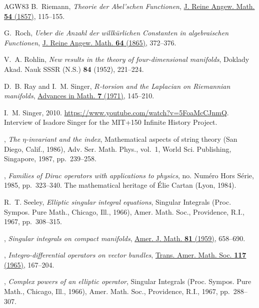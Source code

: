 \documentclass[11pt]{amsart}
\theoremstyle{definition}
\theoremstyle{remark}
\theoremstyle{plain}
\numberwithin{equation}{section}
\renewcommand{\:}{\colon}
\begin{document}
\begin{thebibliography}{AGW83}
B.~Riemann, \emph{Theorie der {A}bel'schen {F}unctionen},
  \href{http://dx.doi.org/10.1515/crll.1857.54.115}{J. Reine Angew. Math.
  \textbf{54} (1857)}, 115--155.

G.~Roch, \emph{Ueber die {A}nzahl der willk\"{u}rlichen {C}onstanten in
  algebraischen {F}unctionen},
  \href{http://dx.doi.org/10.1515/crll.1865.64.372}{J. Reine Angew. Math.
  \textbf{64} (1865)}, 372--376.

V.~A. Rohlin, \emph{New results in the theory of four-dimensional manifolds},
  Doklady Akad. Nauk SSSR (N.S.) \textbf{84} (1952), 221--224.

D.~B. Ray and I.~M. Singer, \emph{{$R$}-torsion and the {L}aplacian on
  {R}iemannian manifolds},
  \href{http://dx.doi.org/10.1016/0001-8708(71)90045-4}{Advances in Math.
  \textbf{7} (1971)}, 145--210.

I.~M. Singer, 2010. \url{https://www.youtube.com/watch?v=5FoaMcCJnmQ}.
  Interview of Isadore Singer for the MIT+150 Infinite History Project.

\bysame, \emph{The {$\eta$}-invariant and the index}, Mathematical aspects of
  string theory ({S}an {D}iego, {C}alif., 1986), Adv. Ser. Math. Phys., vol.~1,
  World Sci. Publishing, Singapore, 1987, pp.~239--258.

\bysame, \emph{Families of {D}irac operators with applications to physics}, no.
  Num\'{e}ro Hors S\'{e}rie, 1985, pp.~323--340. The mathematical heritage of
  \'{E}lie Cartan (Lyon, 1984).

R.~T. Seeley, \emph{Elliptic singular integral equations}, Singular {I}ntegrals
  ({P}roc. {S}ympos. {P}ure {M}ath., {C}hicago, {I}ll., 1966), Amer. Math.
  Soc., Providence, R.I., 1967, pp.~308--315.

\bysame, \emph{Singular integrals on compact manifolds},
  \href{http://dx.doi.org/10.2307/2372921}{Amer. J. Math. \textbf{81} (1959)},
  658--690.

\bysame, \emph{Integro-differential operators on vector bundles},
  \href{http://dx.doi.org/10.2307/1994203}{Trans. Amer. Math. Soc. \textbf{117}
  (1965)}, 167--204.

\bysame, \emph{Complex powers of an elliptic operator}, Singular {I}ntegrals
  ({P}roc. {S}ympos. {P}ure {M}ath., {C}hicago, {I}ll., 1966), Amer. Math.
  Soc., Providence, R.I., 1967, pp.~288--307.


\end{thebibliography}
\end{document}
